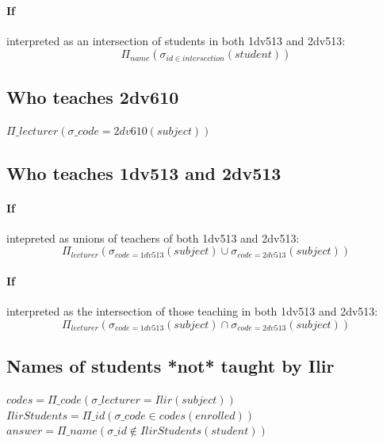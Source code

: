 \documentclass[12pt]{article}
\begin{document}
\paragraph{If} interpreted as an intersection of students in both 1dv513 and 2dv513:
\begin {equation}
\Pi_{name}(\sigma_{id \in intersection}(student))\label{eq:equation2}
\end {equation}

\subsection {Who teaches 2dv610}\label{subsec:who-teaches-2dv610}
\begin{math}
\Pi\_{lecturer} (\sigma\_{code=2dv610}(subject))
\end{math}

\subsection {Who teaches 1dv513 and 2dv513}\label{subsec:who-teaches-1dv513-and-2dv513}

\paragraph{If} intepreted as unions of teachers of both 1dv513 and 2dv513:
\begin {equation}
\Pi_{lecturer} (\sigma_{code=1dv513}(subject) \cup \sigma_{code=2dv513}(subject))\label{eq:equation3}
\end {equation}
\paragraph{If} interpreted as the intersection of those teaching in both 1dv513 and 2dv513:
\begin {equation}
\Pi_{lecturer} (\sigma_{code=1dv513}(subject) \cap \sigma_{code=2dv513}(subject))\label{eq:equation4}
\end {equation}

\subsection {Names of students *not* taught by Ilir}\label{subsec:names-of-students-*not*-taught-by-ilir}

\begin {math}
codes = \Pi\_{code}(\sigma\_{lecturer=Ilir}(subject))
\end{math}
\\
\begin {math}
IlirStudents = \Pi\_{id}(\sigma\_{code \in codes}(enrolled))
\end {math}
\\
\begin {math}
answer = \Pi\_{name}(\sigma\_{id \notin IlirStudents}(student))
\end {math}
\end{document}
